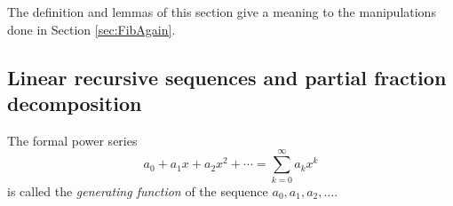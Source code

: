 \begin{page}
\setcounter{section}{2}
\setcounter{subsection}{3}
\setcounter{dfn}{7}
\label{portion:746}



The definition and lemmas of this section give a meaning to the manipulations done in Section \ref{sec:FibAgain}.




\end{page}

\begin{page}
\setcounter{section}{2}
\setcounter{subsection}{3}
\setcounter{dfn}{7}
\label{portion:747}

\subsection{Linear recursive sequences and partial fraction decomposition}

\end{page}

\begin{page}
\setcounter{section}{2}
\setcounter{subsection}{3}
\setcounter{dfn}{8}
\label{portion:749}

\begin{dfn}
The formal power series
\[
a_0 + a_1 x + a_2 x^2 + \cdots = \sum_{k=0}^\infty a_k x^k
\]
is called the \emph{generating function} of the sequence $a_0, a_1, a_2, \ldots$.
\end{dfn}

\end{page}

\begin{page}
\setcounter{section}{2}
\setcounter{subsection}{3}
\setcounter{dfn}{9}
\label{portion:752}


\end{page}

\begin{page}
\setcounter{section}{2}
\setcounter{subsection}{3}
\setcounter{dfn}{9}
\label{portion:753}



\end{page}

